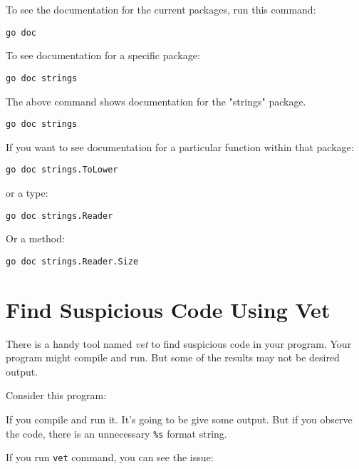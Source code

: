 To see the documentation for the current packages, run this command:

\begin{lstlisting}[numbers=none]
go doc
\end{lstlisting}

To see documentation for a specific package:

\begin{lstlisting}[numbers=none]
go doc strings
\end{lstlisting}

The above command shows documentation for the "strings" package.

\begin{lstlisting}[numbers=none]
go doc strings
\end{lstlisting}

If you want to see documentation for a particular function within that
package:

\begin{lstlisting}[numbers=none]
go doc strings.ToLower
\end{lstlisting}

or a type:

\begin{lstlisting}[numbers=none]
go doc strings.Reader
\end{lstlisting}

Or a method:

\begin{lstlisting}[numbers=none]
go doc strings.Reader.Size
\end{lstlisting}

\section{Find Suspicious Code Using Vet}

There is a handy tool named \textit{vet} to find
suspicious code in your program.  Your program might compile and
run. But some of the results may not be desired output.

Consider this program:



If you compile and run it.  It's going to be give some output.  But if
you observe the code, there is an unnecessary \texttt{\%s} format
string.

If you run \texttt{vet} command, you can see the issue:


